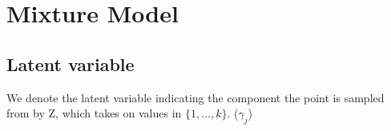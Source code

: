 \section{Mixture Model}
\subsection*{Latent variable}
We denote the latent variable indicating the component the point is sampled from by Z, which takes on values in $\{1,...,k\}$. ($\gamma_j$)

